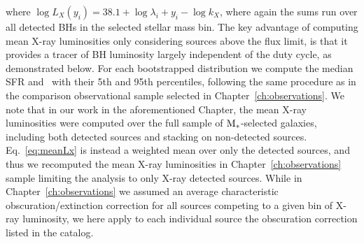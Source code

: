 where $\log L_X(y_i)=38.1 +\log \lambda_i +y_i-\log k_X$, where again the sums run over all detected BHs in the selected stellar mass bin. The key advantage of computing mean X-ray luminosities only considering sources above the flux limit, is that it provides a tracer of BH luminosity largely independent of the duty cycle, as demonstrated below. For each bootstrapped distribution we compute the median SFR and \LX\ with their 5th and 95th percentiles, following the same procedure as in the comparison observational sample selected in Chapter~\ref{ch:observations}. We note that in our work in the aforementioned Chapter, the mean X-ray luminosities were computed over the full sample of ${\rm M}_*$-selected galaxies, including both detected sources and stacking on non-detected sources. Eq.~\ref{eq:meanLx} is instead a weighted mean over only the detected sources, and thus we recomputed the mean X-ray luminosities in Chapter~\ref{ch:observations} sample limiting the analysis to only X-ray detected sources. While in Chapter~\ref{ch:observations} we assumed an average characteristic obscuration/extinction correction for all sources competing to a given bin of X-ray luminosity, we here apply to each individual source the obscuration correction listed in the
\citet{2016ApJ...817...34M} catalog.

